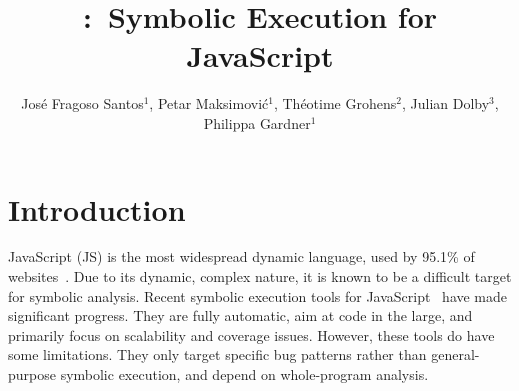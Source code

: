 \documentclass[sigconf, review]{acmart}
\title[\cosette:~Symbolic Execution for JavaScript]{\cosette:~Symbolic Execution for JavaScript}
\author[J. Fragoso Santos, P. Maksimovi\'c, T. Grohens, J. Dolby, P. Gardner]{Jos\'e Fragoso Santos$^1$, Petar Maksimovi\'c$^1$, Th\'eotime
  Grohens$^2$, Julian Dolby$^3$, Philippa Gardner$^1$}
\affiliation{$^1\ $Imperial College London, $^2\ $ENS Paris, $^3\ $IBM Research}
\newcommand{\pgmaxinline}[1]{ {\color{purple} *** PG : #1 ***} }
\newif\ifComments
\newcommand{\pg}[1]{%
\ifComments
\begin{center}
\fbox{\begin{minipage}{0.4\textwidth} \color{red}
{\rm PG: \small #1}
\end{minipage}}
\end{center}
\fi}
\newcommand{\pmax}[1]{%
\ifComments
\begin{center}
\fbox{\begin{minipage}{0.4\textwidth} \color{blue}
{\rm PM: \small #1}
\end{minipage}}
\end{center}
\fi}
\begin{document}
%

\maketitle 


\section{Introduction}
\label{sec:intro}


%
%



JavaScript (JS)  is the most widespread dynamic language, used by 95.1\% of websites~\cite{JS948percent}.
Due to its dynamic, complex nature, it is known to be a difficult target for symbolic analysis. 
Recent symbolic execution tools for JavaScript~\cite{saxena:sp:2010,wittern:icse:2018,li:fse:2014} have made significant progress. 
They are fully automatic, aim at code in the large, and primarily
focus on scalability and coverage issues.  However, these tools do have some
limitations. They only target specific bug
patterns rather than general-purpose symbolic execution, and depend on
whole-program analysis.
\end{document}
